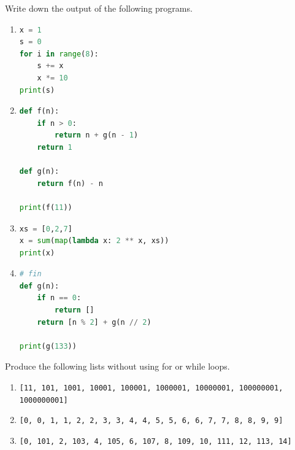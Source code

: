 \documentclass[addpoints,12pt]{exam}
\newcommand{\code}[1]{{\texttt{#1}}}
\begin{document}
\begin{questions}

\question[20]
Write down the output of the following programs.

\begin{enumerate}
\item 
\begin{lstlisting}[language=python]
x = 1
s = 0
for i in range(8):
    s += x
    x *= 10
print(s)
\end{lstlisting}

    \vfill

\item 
\begin{lstlisting}[language=python]
def f(n):
    if n > 0:
        return n + g(n - 1)
    return 1

def g(n):
    return f(n) - n

print(f(11))
\end{lstlisting}
\vfill


\item 
\begin{lstlisting}[language=python]
xs = [0,2,7]
x = sum(map(lambda x: 2 ** x, xs))
print(x)
\end{lstlisting}
\vfill

\item 
\begin{lstlisting}[language=python]
# fin
def g(n):
    if n == 0:
        return [] 
    return [n % 2] + g(n // 2) 

print(g(133))
\end{lstlisting}
%
\vfill

\end{enumerate}

\newpage
\question[20] Produce the following lists without using for or while loops. 
\begin{enumerate}
  \item \code{[11, 101, 1001, 10001, 100001, 1000001, 10000001, 100000001, 1000000001]}
    \vfill
  \item \code{[0, 0, 1, 1, 2, 2, 3, 3, 4, 4, 5, 5, 6, 6, 7, 7, 8, 8, 9, 9]}
    \vfill
  \item \code{[0, 101, 2, 103, 4, 105, 6, 107, 8, 109, 10, 111, 12, 113, 14]}
    \vfill
    
\end{enumerate}





\end{questions}
\end{document}
